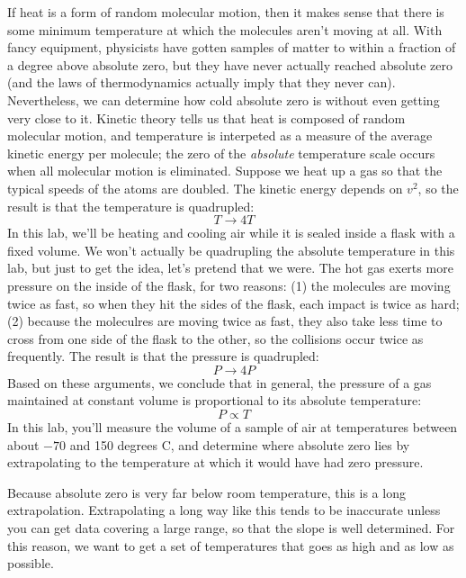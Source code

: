 If heat is a form of random molecular motion, then it makes
sense that there is some minimum temperature at which the
molecules aren't moving at all. With fancy equipment,
physicists have gotten samples of matter to within a
fraction of a degree above absolute zero, but they have
never actually reached absolute zero (and the laws of
thermodynamics actually imply that they never can).
Nevertheless, we can determine how cold absolute zero is
without even getting very close to it. Kinetic theory tells
us that heat is composed of random molecular motion, and
temperature is interpeted as a measure of the average
kinetic energy per molecule; the zero of the \emph{absolute}
temperature scale occurs when all molecular motion is eliminated.
Suppose we heat up a gas so that the typical speeds of
the atoms are doubled. The kinetic energy depends on $v^2$,
so the result is that the temperature is quadrupled:
\begin{equation*}
  T \rightarrow 4T
\end{equation*}
In this lab, we'll be heating and cooling air while it
is sealed inside a flask with a fixed volume. We won't
actually be quadrupling the absolute temperature in this
lab, but just to get the idea, let's pretend that we were.
The hot gas exerts more pressure on the inside of the flask,
for two reasons: (1) the molecules are moving twice as fast,
so when they hit the sides of the flask, each impact is
twice as hard; (2) because the moleculres are moving twice
as fast, they also take less time to cross from one side
of the flask to the other, so the collisions occur twice
as frequently. The result is that the pressure is quadrupled:
\begin{equation*}
  P \rightarrow 4P
\end{equation*}
Based on these arguments, we conclude that in general, the
pressure of a gas maintained at constant volume is proportional
to its absolute temperature:
\begin{equation*}
  P \propto T
\end{equation*}
In this lab, you'll measure
the volume of a sample of air at temperatures between about $-70$ and
150 degrees C, and determine where absolute zero lies by
extrapolating to the temperature at which it would
have had zero pressure.

Because absolute zero is very far below room temperature, this is a long extrapolation.
Extrapolating a long way like this tends to be inaccurate unless you can get data
covering a large range, so that the slope is well determined. For this reason,
we want to get a set of temperatures that goes as high and as low as possible.

